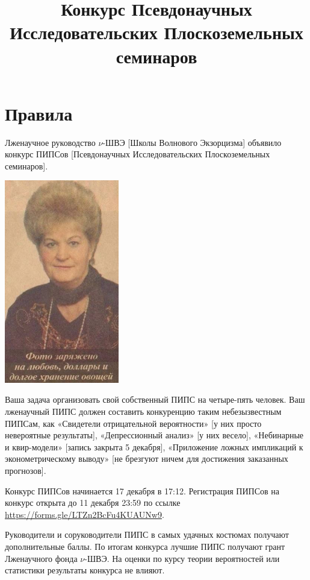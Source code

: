 \documentclass[12pt]{article}
\title{Конкурс Псевдонаучных Исследовательских Плоскоземельных семинаров}
\date{}
\begin{document}
	\maketitle

\section*{Правила}

Лженаучное руководство $\nu$-ШВЭ [Школы Волнового Экзорцизма] объявило конкурс ПИПСов [Псевдо\-на\-уч\-ных Исследовательских Плоскоземельных семинаров].
\begin{center}
    \includegraphics[width=5cm]{zaryajeno.jpg}
\end{center}

Ваша задача организовать свой собственный ПИПС на четыре-пять человек. 
Ваш лженаучный ПИПС должен составить конкуренцию таким небезызвестным ПИПСам, как «Свидетели отрицательной вероят\-нос\-ти» [у них просто невероятные результаты],
«Депрессионный анализ» [у них весело], «Небинарные и квир-модели» [запись закрыта 5 декабря], «Приложение ложных импликаций к эконометрическому выводу» [не брезгуют ничем для достижения заказанных прогнозов].

Конкурс ПИПСов начинается 17 декабря в 17:12.
Регистрация ПИПСов на конкурс открыта до 11 декабря 23:59 по ссылке \url{https://forms.gle/LTZn2BcFu4KUAUNw9}.

Руководители и соруководители ПИПС в самых удачных костюмах получают дополнительные баллы. По итогам конкурса лучшие ПИПС получают грант Лженаучного фонда $\nu$-ШВЭ. На оценки по курсу теории вероятностей или статистики результаты конкурса не влияют. 

\end{document}
